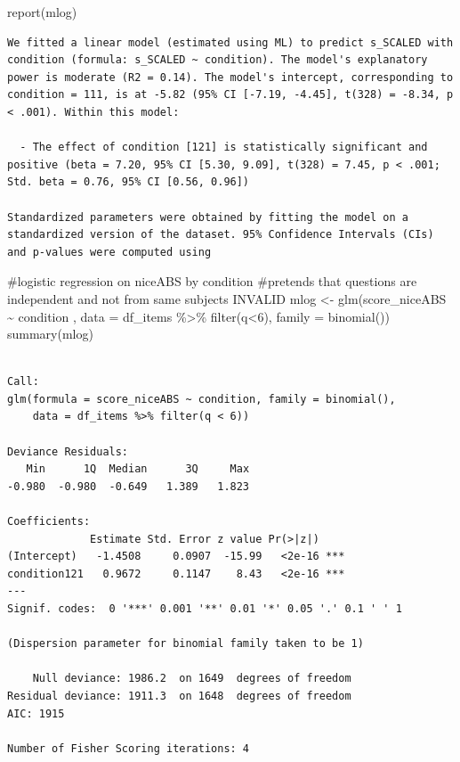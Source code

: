 \documentclass[
  letterpaper,
  DIV=11,
  numbers=noendperiod]{scrreprt}
\newenvironment{Shaded}{\begin{snugshade}}{\end{snugshade}}
\newcommand{\AttributeTok}[1]{\textcolor[rgb]{0.40,0.45,0.13}{#1}}
\newcommand{\CommentTok}[1]{\textcolor[rgb]{0.37,0.37,0.37}{#1}}
\newcommand{\DecValTok}[1]{\textcolor[rgb]{0.68,0.00,0.00}{#1}}
\newcommand{\FunctionTok}[1]{\textcolor[rgb]{0.28,0.35,0.67}{#1}}
\newcommand{\NormalTok}[1]{\textcolor[rgb]{0.00,0.23,0.31}{#1}}
\newcommand{\OtherTok}[1]{\textcolor[rgb]{0.00,0.23,0.31}{#1}}
\newcommand{\SpecialCharTok}[1]{\textcolor[rgb]{0.37,0.37,0.37}{#1}}
\begin{document}
\begin{Shaded}
\begin{Highlighting}[]
\FunctionTok{report}\NormalTok{(mlog)}
\end{Highlighting}
\end{Shaded}

\begin{verbatim}
We fitted a linear model (estimated using ML) to predict s_SCALED with condition (formula: s_SCALED ~ condition). The model's explanatory power is moderate (R2 = 0.14). The model's intercept, corresponding to condition = 111, is at -5.82 (95% CI [-7.19, -4.45], t(328) = -8.34, p < .001). Within this model:

  - The effect of condition [121] is statistically significant and positive (beta = 7.20, 95% CI [5.30, 9.09], t(328) = 7.45, p < .001; Std. beta = 0.76, 95% CI [0.56, 0.96])

Standardized parameters were obtained by fitting the model on a standardized version of the dataset. 95% Confidence Intervals (CIs) and p-values were computed using 
\end{verbatim}

\begin{Shaded}
\begin{Highlighting}[]
\CommentTok{\#logistic regression on niceABS by condition}
\CommentTok{\#pretends that questions are independent and not from same subjects INVALID}
\NormalTok{mlog }\OtherTok{\textless{}{-}} \FunctionTok{glm}\NormalTok{(score\_niceABS }\SpecialCharTok{\textasciitilde{}}\NormalTok{ condition , }\AttributeTok{data =}\NormalTok{ df\_items }\SpecialCharTok{\%\textgreater{}\%} \FunctionTok{filter}\NormalTok{(q}\SpecialCharTok{\textless{}}\DecValTok{6}\NormalTok{), }\AttributeTok{family =} \FunctionTok{binomial}\NormalTok{())}
\FunctionTok{summary}\NormalTok{(mlog)}
\end{Highlighting}
\end{Shaded}

\begin{verbatim}

Call:
glm(formula = score_niceABS ~ condition, family = binomial(), 
    data = df_items %>% filter(q < 6))

Deviance Residuals: 
   Min      1Q  Median      3Q     Max  
-0.980  -0.980  -0.649   1.389   1.823  

Coefficients:
             Estimate Std. Error z value Pr(>|z|)    
(Intercept)   -1.4508     0.0907  -15.99   <2e-16 ***
condition121   0.9672     0.1147    8.43   <2e-16 ***
---
Signif. codes:  0 '***' 0.001 '**' 0.01 '*' 0.05 '.' 0.1 ' ' 1

(Dispersion parameter for binomial family taken to be 1)

    Null deviance: 1986.2  on 1649  degrees of freedom
Residual deviance: 1911.3  on 1648  degrees of freedom
AIC: 1915

Number of Fisher Scoring iterations: 4
\end{verbatim}
\end{document}
